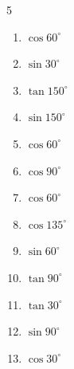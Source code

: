 \begin{multicols}{5}
\begin{enumerate}
  \item $\displaystyle \cos{60^\circ}$


  \item $\displaystyle \sin{30^\circ}$


  \item $\displaystyle \tan{150^\circ}$


  \item $\displaystyle \sin{150^\circ}$


  \item $\displaystyle \cos{60^\circ}$


\columnbreak %

  \item $\displaystyle \cos{90^\circ}$

        \phantom{$\displaystyle =0$}

  \item $\displaystyle \cos{60^\circ}$


  \item $\displaystyle \cos{135^\circ}$


  \item $\displaystyle \sin{60^\circ}$


  \item $\displaystyle \tan{90^\circ}$

        \phantom{$\displaystyle なし$}

  \item $\displaystyle \tan{30^\circ}$


  \item $\displaystyle \sin{90^\circ}$

        \phantom{$\displaystyle =1$}

  \item $\displaystyle \cos{30^\circ}$


\end{enumerate}
\end{multicols}
